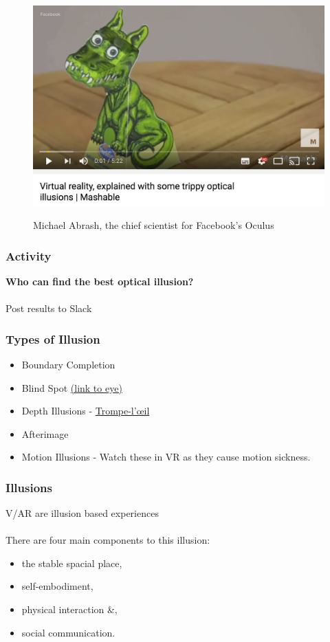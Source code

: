 \begin{frame}
	\begin{figure}
		\href{https://www.youtube.com/watch?v=qD3w3cAhEYU}{ \includegraphics[scale=.4]{assets/optical}  }
		\caption{Michael Abrash, the chief scientist for Facebook's Oculus}
	\end{figure}
\end{frame}

\begin{frame}
	\frametitle{Activity}
	\textbf{Who can find the best optical illusion?} \\~\\
	
	Post results to Slack
	
\end{frame}

\begin{frame}
	\frametitle{Types of Illusion}
	\begin{itemize}
		\item Boundary Completion
		\item Blind Spot \href{http://snowbrains.com/wp-content/uploads/2013/07/eyeball.jpg}{ (link to eye)}
		\item Depth Illusions - \href{https://www.youtube.com/watch?v=QmMTwjUdqbg}{Trompe-l'\oe il}
		\item Afterimage
		\item Motion Illusions - Watch these in VR as they cause motion sickness. 
	\end{itemize}
\end{frame}

\begin{frame}
	\frametitle{Illusions}
	V/AR are illusion based experiences \\~\\ 
	
	There are four main components to this illusion:
	\begin{itemize}
		\item the stable spacial place,
		\item self-embodiment,
		\item physical interaction \&,
		\item social communication.
	\end{itemize}
\end{frame}


